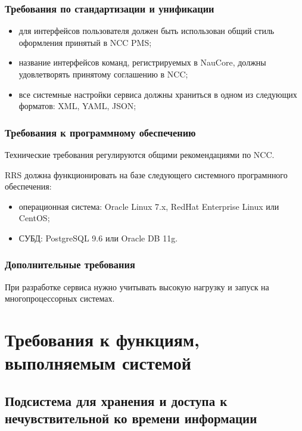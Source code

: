 \subsubsection{Требования по стандартизации и унификации}

\begin{itemize}
    \item для интерфейсов пользователя должен быть использован общий стиль оформления принятый в NCC PMS;
    \item название интерфейсов команд, регистрируемых в NauCore, должны удовлетворять принятому соглашению в NCC;
    \item все системные настройки сервиса должны храниться в одном из следующих форматов: XML, YAML, JSON\@;
\end{itemize}

\subsubsection{Требования к программному обеспечению}

Технические требования регулируются общими рекомендациями по NCC.

RRS должна функционировать на базе следующего системного програмнного обеспечения:
\begin{itemize}
    \item операционная система: Oracle Linux 7.x, RedHat Enterprise Linux или CentOS;
    \item СУБД: PostgreSQL 9.6 или Oracle DB 11g.
\end{itemize}

\subsubsection{Дополнительные требования}

При разработке сервиса нужно учитывать высокую нагрузку и запуск на многопроцессорных системах.

\section{Требования к функциям, выполняемым системой}

\subsection{Подсистема для хранения и доступа к нечувствительной ко времени информации}

